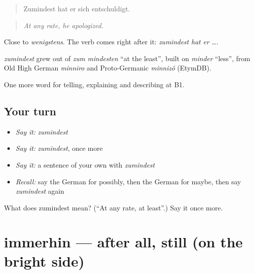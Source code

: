 \begin{quote}
Zumindest hat er sich entschuldigt.
\end{quote}

\begin{quote}
\emph{At any rate, he apologized.}
\end{quote}

Close to \emph{wenigstens}. The verb comes right after it: \emph{zumindest hat er …}.

\begin{cousinweb}
\emph{zumindest} grew out of \emph{zum mindesten} \textquotedblleft{}at the least\textquotedblright{}, built on \emph{minder} \textquotedblleft{}less\textquotedblright{}, from Old High German \emph{minniro} and Proto-Germanic \emph{minnizô} (EtymDB).
\end{cousinweb}

\begin{grammarlens}[title={What you've built}]
One more word for telling, explaining and describing at B1.
\end{grammarlens}

\subsection*{Your turn}
\begin{itemize}
\raggedright
  \item \emph{Say it:} \emph{zumindest}
  \item \emph{Say it:} \emph{zumindest}, once more
  \item \emph{Say it:} a sentence of your own with \emph{zumindest}
  \item \emph{Recall:} say the German for possibly, then the German for maybe, then say \emph{zumindest} again
\end{itemize}

\begin{tcolorbox}[breakable,colback=teal!4,colframe=teal!35!black,title={Before you move on}]
What does zumindest mean? (\textquotedblleft{}At any rate, at least\textquotedblright{}.) Say it once more.
\end{tcolorbox}
\section[immerhin]{immerhin — after all, still (on the bright side)}

\label{lesson:GE-C367-immerhin}



